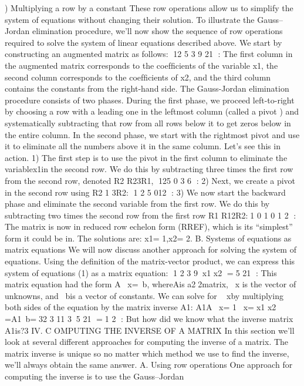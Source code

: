 \right) Multiplying a row by a constant
These row operations allow us to simplify the system of equations without
changing their solution.
To illustrate the Gauss–Jordan elimination procedure, we’ll now show the
sequence of row operations required to solve the system of linear equations
described above. We start by constructing an augmented matrix as follows:
12 5
3 9 21
:
The ﬁrst column in the augmented matrix corresponds to the coefﬁcients of
the variable x1, the second column corresponds to the coefﬁcients of x2,
and the third column contains the constants from the right-hand side.
The Gauss-Jordan elimination procedure consists of two phases. During
the ﬁrst phase, we proceed left-to-right by choosing a row with a leading
one in the leftmost column \left(called a pivot \right) and systematically subtracting
that row from all rows below it to get zeros below in the entire column. In
the second phase, we start with the rightmost pivot and use it to eliminate
all the numbers above it in the same column. Let’s see this in action.
1\right) The ﬁrst step is to use the pivot in the ﬁrst column to eliminate the
variablex1in the second row. We do this by subtracting three times
the ﬁrst row from the second row, denoted R2 R2 3R1,
125
0 3 6
:
2\right) Next, we create a pivot in the second row using R2 1
3R2:
1 2 5
012
:
3\right) We now start the backward phase and eliminate the second variable
from the ﬁrst row. We do this by subtracting two times the second
row from the ﬁrst row R1 R1 2R2:1 0 1
0 1 2
:
The matrix is now in reduced row echelon form \left(RREF\right), which is its
“simplest” form it could be in. The solutions are: x1= 1,x2= 2.
B. Systems of equations as matrix equations
We will now discuss another approach for solving the system of
equations. Using the deﬁnition of the matrix-vector product, we can express
this system of equations \left(1\right) as a matrix equation:
1 2
3 9x1
x2
=5
21
:
This matrix equation had the form A~ x=~b, whereAis a22matrix,~ x
is the vector of unknowns, and ~bis a vector of constants. We can solve for
~ xby multiplying both sides of the equation by the matrix inverse A 1:
A 1A~ x= 1~ x=x1
x2
=A 1~b=3 2
3
 11
35
21
=1
2
:
But how did we know what the inverse matrix A 1is?3
IV. C OMPUTING THE INVERSE OF A MATRIX
In this section we’ll look at several different approaches for computing
the inverse of a matrix. The matrix inverse is unique so no matter which
method we use to ﬁnd the inverse, we’ll always obtain the same answer.
A. Using row operations
One approach for computing the inverse is to use the Gauss–Jordan
